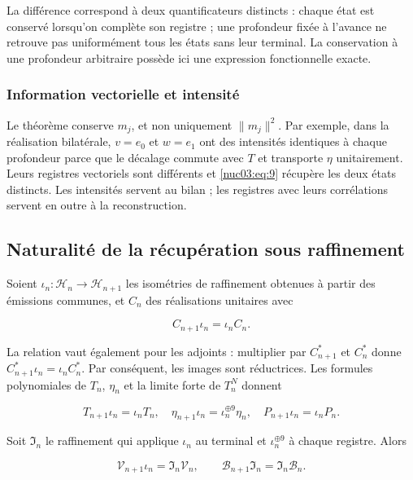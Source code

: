 La différence correspond à deux quantificateurs distincts : chaque état est conservé lorsqu’on complète son registre ; une profondeur fixée à l’avance ne retrouve pas uniformément tous les états sans leur terminal. La conservation à une profondeur arbitraire possède ici une expression fonctionnelle exacte.

\subsubsection{Information vectorielle et intensité}

Le théorème conserve \(m_j\), et non uniquement \(\|m_j\|^2\). Par exemple, dans la réalisation bilatérale, \(v=e_0\) et \(w=e_1\) ont des intensités identiques à chaque profondeur parce que le décalage commute avec \(T\) et transporte \(\eta\) unitairement. Leurs registres vectoriels sont différents et \eqref{nuc03:eq:9} récupère les deux états distincts. Les intensités servent au bilan ; les registres avec leurs corrélations servent en outre à la reconstruction.

\subsection{Naturalité de la récupération sous raffinement
}

Soient \(\iota_n:\mathcal H_n\to\mathcal H_{n+1}\) les isométries de raffinement obtenues à partir des émissions communes, et \(C_n\) des réalisations unitaires avec

\begin{equation}
C_{n+1}\iota_n=\iota_nC_n.
\label{nuc03:eq:12}
\end{equation}

La relation vaut également pour les adjoints : multiplier par \(C_{n+1}^*\) et \(C_n^*\) donne \(C_{n+1}^*\iota_n=\iota_nC_n^*\). Par conséquent, les images sont réductrices. Les formules polynomiales de \(T_n\), \(\eta_n\) et la limite forte de \(T_n^N\) donnent


\begin{equation}
T_{n+1}\iota_n=\iota_nT_n,\quad
\eta_{n+1}\iota_n=\iota_n^{\oplus9}\eta_n,\quad
P_{n+1}\iota_n=\iota_nP_n.
\label{nuc03:eq:13}
\end{equation}

Soit \(\mathfrak I_n\) le raffinement qui applique \(\iota_n\) au terminal et \(\iota_n^{\oplus9}\) à chaque registre. Alors

\begin{equation}
\boxed{\mathcal V_{n+1}\iota_n=\mathfrak I_n\mathcal V_n,\qquad
\mathcal B_{n+1}\mathfrak I_n=\mathfrak I_n\mathcal B_n.}
\label{nuc03:eq:14}
\end{equation}

